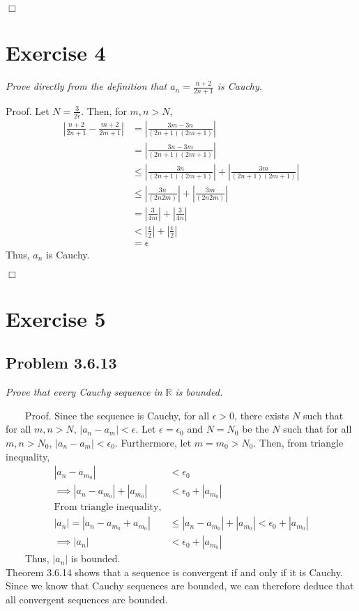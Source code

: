 \documentclass[
]{article}
\begin{document}
\hfill \(\Box\)

\hypertarget{exercise-4}{%
\section{Exercise 4}\label{exercise-4}}

\textit{Prove directly from the definition that $a_n=\frac{n + 2}{2n + 1}$ is Cauchy.}

Proof. Let \(N = \frac{3}{2\epsilon}\). Then, for \(m, n > N\),
\[\begin{aligned}|\frac{n+2}{2n+1} - \frac{m+2}{2m+1}| &= |\frac{3m - 3n}{(2n+1)(2m+1)}| 
\\ &=|\frac{3n - 3m}{(2n+1)(2m+1)}| \\
&\leq |\frac{3n}{(2n+1)(2m+1)}| + |\frac{3m}{(2n+1)(2m+1)}| \\
&\leq |\frac{3n}{(2n2m)}| + |\frac{3m}{(2n2m)}| \\
&= |\frac{3}{4m}| + |\frac{3}{4n}| \\
&< |\frac{\epsilon}{2}| + |\frac{\epsilon}{2}| \\
&= \epsilon
\end{aligned}\] Thus, \(a_n\) is Cauchy.

\hfill \(\Box\)

\hypertarget{exercise-5}{%
\section{Exercise 5}\label{exercise-5}}

\hypertarget{problem-3.6.13}{%
\subsection{Problem 3.6.13}\label{problem-3.6.13}}

\textit{Prove that every Cauchy sequence in $\mathbb{R}$ is bounded.}

~~~~Proof. Since the sequence is Cauchy, for all \(\epsilon > 0\), there
exists \(N\) such that for all \(m, n > N\), \(|a_n - a_m| < \epsilon\).
Let \(\epsilon = \epsilon_0\) and \(N = N_0\) be the \(N\) such that for
all \(m, n > N_0\), \(|a_n - a_m| < \epsilon_0\). Furthermore, let
\(m=m_0>N_0\). Then, from triangle inequality,
\[\begin{aligned}|a_n -a_{m_0}| &<\epsilon_0 \\
\implies |a_n -a_{m_0}| + |a_{m_0}| &<\epsilon_0 + |a_{m_0}| \\
\text{From triangle inequality,} \\
|a_n| = |a_n - a_{m_0} + a_{m_0}| &\leq |a_n -a_{m_0}| + |a_{m_0}|<\epsilon_0 + |a_{m_0}|\\
\implies |a_n|&<\epsilon_0 + |a_{m_0}|
\end{aligned}\] ~~~~Thus, \(|a_n|\) is bounded.\\
\hspace*{0.333em}\hspace*{0.333em}\hspace*{0.333em}\hspace*{0.333em}Theorem
3.6.14 shows that a sequence is convergent if and only if it is Cauchy.
Since we know that Cauchy sequences are bounded, we can therefore deduce
that all convergent sequences are bounded.
\end{document}
